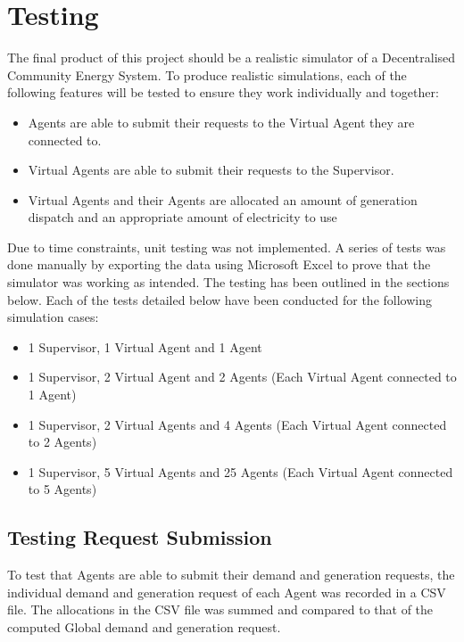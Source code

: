 \chapter{Testing}
\label{Testing}

The final product of this project should be a realistic simulator of a Decentralised Community Energy System. To produce realistic simulations, each of the following features will be tested to ensure they work individually and together:

\begin{itemize}
\item Agents are able to submit their requests to the Virtual Agent they are connected to.
\item Virtual Agents are able to submit their requests to the Supervisor.
\item Virtual Agents and their Agents are allocated an amount of generation dispatch and an appropriate amount of electricity to use 
\end{itemize}

Due to time constraints, unit testing was not implemented. A series of tests was done manually by exporting the data using Microsoft Excel to prove that the simulator was working as intended. The testing has been outlined in the sections below. Each of the tests detailed below have been conducted for the following simulation cases:

\begin{itemize}
	\item 1 Supervisor, 1 Virtual Agent and 1 Agent
	\item 1 Supervisor, 2 Virtual Agent and 2 Agents (Each Virtual Agent connected to 1 Agent)
	\item 1 Supervisor, 2 Virtual Agents and 4 Agents (Each Virtual Agent connected to 2 Agents)
	\item 1 Supervisor, 5 Virtual Agents and 25 Agents (Each Virtual Agent connected to 5 Agents)
\end{itemize}

\section*{Testing Request Submission} %
To test that Agents are able to submit their demand and generation requests, the individual demand and generation request of each Agent was recorded in a CSV file. The allocations in the CSV file was summed and compared to that of the computed Global demand and generation request.

